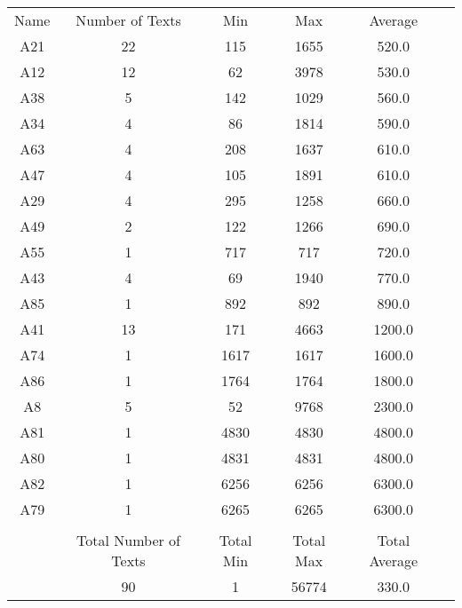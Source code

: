 \newpage
\begin{tabular}{cccccc}
Name & Number of Texts & Min & Max & Average\\
A21 & 22 & 115 & 1655 & 520.0\\
A12 & 12 & 62 & 3978 & 530.0\\
A38 & 5 & 142 & 1029 & 560.0\\
A34 & 4 & 86 & 1814 & 590.0\\
A63 & 4 & 208 & 1637 & 610.0\\
A47 & 4 & 105 & 1891 & 610.0\\
A29 & 4 & 295 & 1258 & 660.0\\
A49 & 2 & 122 & 1266 & 690.0\\
A55 & 1 & 717 & 717 & 720.0\\
A43 & 4 & 69 & 1940 & 770.0\\
A85 & 1 & 892 & 892 & 890.0\\
A41 & 13 & 171 & 4663 & 1200.0\\
A74 & 1 & 1617 & 1617 & 1600.0\\
A86 & 1 & 1764 & 1764 & 1800.0\\
A8 & 5 & 52 & 9768 & 2300.0\\
A81 & 1 & 4830 & 4830 & 4800.0\\
A80 & 1 & 4831 & 4831 & 4800.0\\
A82 & 1 & 6256 & 6256 & 6300.0\\
A79 & 1 & 6265 & 6265 & 6300.0\\
& & & & & \\ 
& Total Number of Texts & Total Min & Total Max & Total Average \\ 
 & 90 & 1 & 56774 & 330.0\\ 
\end{tabular}
